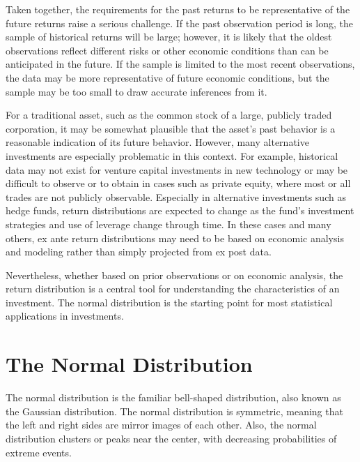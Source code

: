 \documentclass[11pt]{article}
\begin{document}
Taken together, the requirements for the past returns to be representative of the future returns raise a serious challenge. If the past observation period is long, the sample of historical returns will be large; however, it is likely that the oldest observations reflect different risks or other economic conditions than can be anticipated in the future. If the sample is limited to the most recent observations, the data may be more representative of future economic conditions, but the sample may be too small to draw accurate inferences from it.

For a traditional asset, such as the common stock of a large, publicly traded corporation, it may be somewhat plausible that the asset's past behavior is a reasonable indication of its future behavior. However, many alternative investments are especially problematic in this context. For example, historical data may not exist for venture capital investments in new technology or may be difficult to observe or to obtain in cases such as private equity, where most or all trades are not publicly observable. Especially in alternative investments such as hedge funds, return distributions are expected to change as the fund's investment strategies and use of leverage change through time. In these cases and many others, ex ante return distributions may need to be based on economic analysis and modeling rather than simply projected from ex post data.

Nevertheless, whether based on prior observations or on economic analysis, the return distribution is a central tool for understanding the characteristics of an investment. The normal distribution is the starting point for most statistical applications in investments.

\section*{The Normal Distribution}
The normal distribution is the familiar bell-shaped distribution, also known as the Gaussian distribution. The normal distribution is symmetric, meaning that the left and right sides are mirror images of each other. Also, the normal distribution clusters or peaks near the center, with decreasing probabilities of extreme events.
\end{document}
